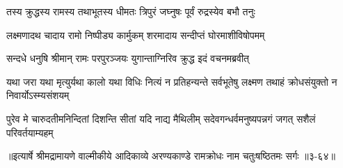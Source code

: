 \twolineshloka
{तस्य क्रुद्धस्य रामस्य तथाभूतस्य धीमतः}
{त्रिपुरं जघ्नुषः पूर्वं रुद्रस्येव बभौ तनुः} %

\twolineshloka
{लक्ष्मणादथ चादाय रामो निष्पीड्य कार्मुकम्}
{शरमादाय सन्दीप्तं घोरमाशीविषोपमम्} %

\twolineshloka
{सन्दधे धनुषि श्रीमान् रामः परपुरञ्जयः}
{युगान्ताग्निरिव क्रुद्ध इदं वचनमब्रवीत्} %

\threelineshloka
{यथा जरा यथा मृत्युर्यथा कालो यथा विधिः}
{नित्यं न प्रतिहन्यन्ते सर्वभूतेषु लक्ष्मण}
{तथाहं क्रोधसंयुक्तो न निवार्योऽस्म्यसंशयम्} %

\twolineshloka
{पुरेव मे चारुदतीमनिन्दितां दिशन्ति सीतां यदि नाद्य मैथिलीम्}
{सदेवगन्धर्वमनुष्यपन्नगं जगत् सशैलं परिवर्तयाम्यहम्} %


॥इत्यार्षे श्रीमद्रामायणे वाल्मीकीये आदिकाव्ये अरण्यकाण्डे रामक्रोधः नाम चतुःषष्ठितमः सर्गः ॥३-६४॥
